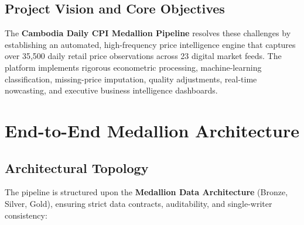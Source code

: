 \documentclass[11pt,a4paper]{article}
\begin{document}
\subsection{Project Vision and Core Objectives}
The \textbf{Cambodia Daily CPI Medallion Pipeline} resolves these challenges by establishing an automated, high-frequency price intelligence engine that captures over 35,500 daily retail price observations across 23 digital market feeds. The platform implements rigorous econometric processing, machine-learning classification, missing-price imputation, quality adjustments, real-time nowcasting, and executive business intelligence dashboards.

\newpage

\section{End-to-End Medallion Architecture}

\subsection{Architectural Topology}
The pipeline is structured upon the \textbf{Medallion Data Architecture} (Bronze, Silver, Gold), ensuring strict data contracts, auditability, and single-writer consistency:
\end{document}
